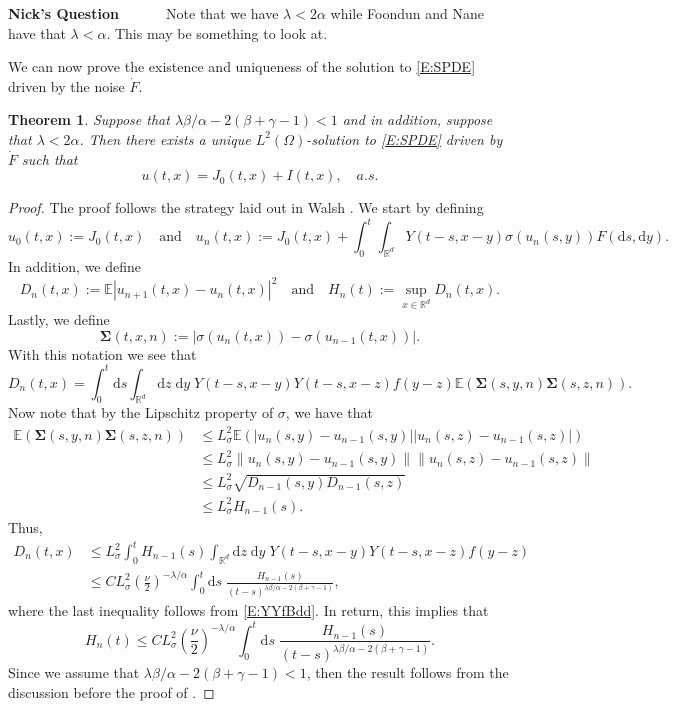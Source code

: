 \documentclass[a4paper,11pt]{article}
\numberwithin{equation}{section}
\theoremstyle{plain}
\newtheorem{theorem}{Theorem}[section]
\theoremstyle{definition}
\newcommand{\ud}{\ensuremath{\mathrm{d} }}
\newcommand{\Norm}[1]{\left\|  #1   \right\|}
\newcommand{\R}{\mathbb{R}}
\newcounter{NQ}
\newenvironment{NickQuestion}[1][] %
{\refstepcounter{NQ}
	\begin{mdframed}[backgroundcolor=lightgray]\textbf{Nick's Question \theNQ \: #1~~}~~~\noindent}%
	{\end{mdframed}}
\numberwithin{NQ}{section}
\numberwithin{LQ}{section}
\numberwithin{ZQ}{section}
\begin{document}
	\begin{NickQuestion}
		Note that we have $\lambda < 2 \alpha$ while Foondun and Nane \cite{FN2016} have that $\lambda < \alpha$. This may be something to look at. 
	\end{NickQuestion}
	We can now prove the existence and uniqueness of the solution to \eqref{E:SPDE} driven by the noise $\dot{F}$. 
	
	\begin{theorem}
		\label{T:ExisAndUniq}
		Suppose that $\lambda \beta / \alpha - 2(\beta + \gamma -1) < 1$ and in addition, suppose that $\lambda < 2 \alpha$. Then there exists a unique $L^2(\Omega)$-solution to \eqref{E:SPDE} driven by $\dot{F}$ such that 
		\[
		u(t,x) = J_0(t,x) + I(t,x), \quad a.s.
		\]
	\end{theorem} 
	\begin{proof}
		The proof follows the strategy laid out in Walsh \cite{Walsh89}. We start by defining 
		\[
		u_0(t,x) := J_0(t,x) \quad \text{and} \quad u_n(t,x) := J_0(t,x) + \int_0^t \int_{\R^d} Y(t-s,x-y) \sigma(u_n(s,y)) F(\ud s, \ud y). 
		\]
		In addition, we define 
		\[
		D_n(t,x) := \mathbb{E}\left| u_{n+1}(t,x) - u_n(t,x) \right|^2 \quad \text{and} \quad H_n(t) := \sup_{x \in \R^d} D_n(t,x).
		\]
		Lastly, we define 
		\[
		\mathbf{\Sigma} (t,x,n) := | \sigma( u_n(t,x) ) - \sigma(u_{n-1} (t,x) ) |.
		\]
		With this notation we see that 
		\[
		D_n(t,x) = \int_0^t \ud s \int_{\R^d} \ud z \; \ud y \; Y(t-s,x-y) Y(t-s,x-z) f(y-z) \mathbb{E}\left(\mathbf{\Sigma}(s,y,n) \mathbf{\Sigma}(s,z,n)\right).
		\]
		Now note that by the Lipschitz property of $\sigma$, we have that  
		\begin{align*}
		\mathbb{E}\left(\mathbf{\Sigma}(s,y,n) \mathbf{\Sigma}(s,z,n)\right) &\le L^2_{\sigma} \mathbb{E} \left(|u_n(s,y)-u_{n-1}(s,y)||u_n(s,z)-u_{n-1}(s,z)|\right) \\
		& \le L^2_{\sigma} \Norm{ u_n(s,y)-u_{n-1}(s,y) } \Norm{u_n(s,z)-u_{n-1}(s,z)} \\ 
		& \le L^2_{\sigma} \sqrt{D_{n-1}(s,y) D_{n-1}(s,z)} \\
		& \le L^2_{\sigma} H_{n-1}(s).
		\end{align*}
		Thus, 
		\begin{align*}
		D_n(t,x) &\le L^2_{\sigma} \int_0^t H_{n-1}(s) \int_{\R^d} \ud z \; \ud y \; Y(t-s,x-y) Y(t-s,x-z) f(y-z) \\
		&\le C L^2_{\sigma} \left(\frac{\nu}{2}\right)^{-\lambda / \alpha} \int_0^t \ud s \; \frac{H_{n-1}(s)}{(t-s)^{\lambda \beta / \alpha - 2(\beta + \gamma -1)}},
		\end{align*}
		where the last inequality follows from \eqref{E:YYfBdd}. In return, this implies that 
		\[
		H_n(t) \le C L^2_{\sigma} \left(\frac{\nu}{2}\right)^{-\lambda / \alpha} \int_0^t \ud s \; \frac{H_{n-1}(s)}{(t-s)^{\lambda \beta / \alpha - 2(\beta + \gamma -1)}}.
		\]
		Since we assume that $\lambda \beta / \alpha - 2(\beta + \gamma -1) < 1$, then the result follows from the discussion before the proof of \cite[Lemma 3.3]{Walsh89}. 
	\end{proof}
	
\end{document}
